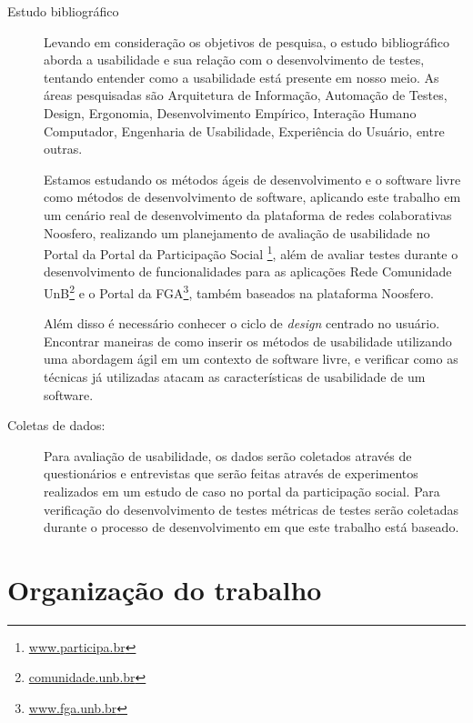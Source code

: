 \begin{description}
\item[Estudo bibliográfico]

Levando em consideração os objetivos de pesquisa, o estudo bibliográfico  aborda a usabilidade e sua relação com o desenvolvimento de testes, tentando entender como a usabilidade está presente em nosso meio. As áreas pesquisadas são Arquitetura de Informação, Automação de Testes, Design, Ergonomia, Desenvolvimento Empírico, Interação Humano Computador, Engenharia de Usabilidade, Experiência do Usuário, entre outras.

%
Estamos estudando os métodos ágeis de desenvolvimento e o software livre como métodos de desenvolvimento de software, aplicando este trabalho em um cenário real de desenvolvimento da plataforma de redes colaborativas Noosfero, realizando um planejamento de avaliação de usabilidade no Portal da Portal da Participação Social \footnote{\url{www.participa.br}}, além de avaliar testes durante o desenvolvimento de funcionalidades para as aplicações Rede Comunidade UnB\footnote{\url{comunidade.unb.br}} e o Portal da FGA\footnote{\url{www.fga.unb.br}}, também baseados na plataforma Noosfero.


%
Além disso é necessário conhecer o ciclo de \emph{design} centrado no usuário. Encontrar maneiras de como inserir os métodos de usabilidade utilizando uma abordagem ágil em um contexto de software livre, e verificar como as técnicas já utilizadas atacam as características de usabilidade de um software.
%


\item[Coletas de dados:]
%

Para avaliação de usabilidade, os dados serão coletados através de questionários e entrevistas que serão feitas através de experimentos realizados em um estudo de caso no portal da participação social.
Para verificação do desenvolvimento de testes métricas de testes serão coletadas durante o processo de desenvolvimento em que este trabalho está baseado.

\end{description}

\section{Organização do trabalho}

